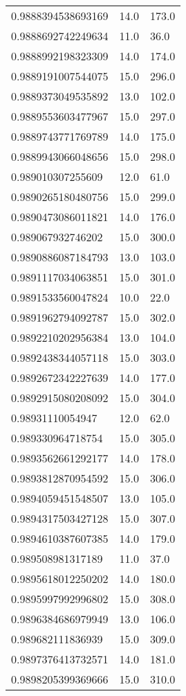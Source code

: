 \begin{center}
\begin{supertabular}[H]{p{0.30\textwidth}p{0.05\textwidth}p{0.05\textwidth}}
0.9888394538693169 & 14.0 & 173.0 \\ 
0.9888692742249634 & 11.0 & 36.0 \\ 
0.9888992198323309 & 14.0 & 174.0 \\ 
0.9889191007544075 & 15.0 & 296.0 \\ 
0.9889373049535892 & 13.0 & 102.0 \\ 
0.9889553603477967 & 15.0 & 297.0 \\ 
0.9889743771769789 & 14.0 & 175.0 \\ 
0.9889943066048656 & 15.0 & 298.0 \\ 
0.989010307255609 & 12.0 & 61.0 \\ 
0.9890265180480756 & 15.0 & 299.0 \\ 
0.9890473086011821 & 14.0 & 176.0 \\ 
0.989067932746202 & 15.0 & 300.0 \\ 
0.9890886087184793 & 13.0 & 103.0 \\ 
0.9891117034063851 & 15.0 & 301.0 \\ 
0.9891533560047824 & 10.0 & 22.0 \\ 
0.9891962794092787 & 15.0 & 302.0 \\ 
0.9892210202956384 & 13.0 & 104.0 \\ 
0.9892438344057118 & 15.0 & 303.0 \\ 
0.9892672342227639 & 14.0 & 177.0 \\ 
0.9892915080208092 & 15.0 & 304.0 \\ 
0.98931110054947 & 12.0 & 62.0 \\ 
0.989330964718754 & 15.0 & 305.0 \\ 
0.9893562661292177 & 14.0 & 178.0 \\ 
0.9893812870954592 & 15.0 & 306.0 \\ 
0.9894059451548507 & 13.0 & 105.0 \\ 
0.9894317503427128 & 15.0 & 307.0 \\ 
0.9894610387607385 & 14.0 & 179.0 \\ 
0.989508981317189 & 11.0 & 37.0 \\ 
0.9895618012250202 & 14.0 & 180.0 \\ 
0.9895997992996802 & 15.0 & 308.0 \\ 
0.9896384686979949 & 13.0 & 106.0 \\ 
0.989682111836939 & 15.0 & 309.0 \\ 
0.9897376413732571 & 14.0 & 181.0 \\ 
0.9898205399369666 & 15.0 & 310.0 \\ 

\end{supertabular}
\end{center}
